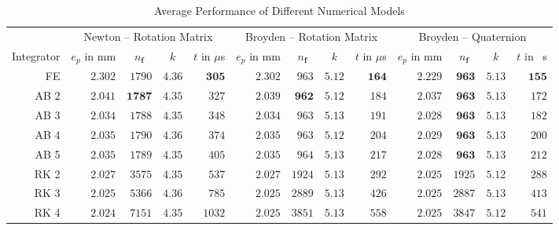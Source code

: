 {\begin{table}
	\centering
	\caption{Average Performance of Different Numerical Models}
	\label{tab:results}
	\begin{tabular}{r rrrr rrrr rrrr}
		\toprule
		& \multicolumn{4}{c}{Newton -- Rotation Matrix}
		& \multicolumn{4}{c}{Broyden -- Rotation Matrix}
        & \multicolumn{4}{c}{Broyden -- Quaternion}\\
		\cmidrule(lr){2-5}
		\cmidrule(lr){6-9}
		\cmidrule(l){10-13}
		\multicolumn{1}{c}{\hfill  Integrator}
		& \multicolumn{1}{c}{$e_p$ in \si{mm}}
		& \multicolumn{1}{c}{$n_{\boldsymbol{f}}$}
		& \multicolumn{1}{c}{$k$}
		& \multicolumn{1}{c}{$t$ in $\mu$\si{s}}
		& \multicolumn{1}{c}{$e_p$ in \si{mm}}
		& \multicolumn{1}{c}{$n_{\boldsymbol{f}}$}
		& \multicolumn{1}{c}{$k$}
		& \multicolumn{1}{c}{$t$ in $\mu$\si{s}}
		& \multicolumn{1}{c}{$e_p$ in \si{mm}}
		& \multicolumn{1}{c}{$n_{\boldsymbol{f}}$}
		& \multicolumn{1}{c}{$k$}
		& \multicolumn{1}{c}{$t$ in \si{\mu s}}\\
		\cmidrule(r){1-1}
		\cmidrule(lr){2-2}
		\cmidrule(lr){3-3}
		\cmidrule(lr){4-4}
		\cmidrule(lr){5-5}
		\cmidrule(lr){6-6}
		\cmidrule(lr){7-7}
		\cmidrule(lr){8-8}
		\cmidrule(lr){9-9}
		\cmidrule(lr){10-10}
		\cmidrule(lr){11-11}
		\cmidrule(lr){12-12}
		\cmidrule(l){13-13}
    FE              & $2.302$ & $1790$ & $4.36$ & $\mathbf{305}$ 
                    & $2.302$ & $963$  & $\mathbf{5.12}$ & $\mathbf{164}$
                    & $2.229$ & $\mathbf{963}$  & $5.13$ & $\mathbf{155}$ \\
    AB 2	        & $2.041$ & $\mathbf{1787}$ & $\mathbf{4.35}$ & $327$  
                    & $2.039$ & $\mathbf{962}$  & $\mathbf{5.12}$ & $184$ 
                    & $2.037$ & $\mathbf{963}$  & $5.13$ & $172$ \\
    AB 3      	    & $2.034$ & $1788$ & $\mathbf{4.35}$ & $348$ 
                    & $2.034$ & $963$  & $5.13$ & $191$ 
                    & $2.028$ & $\mathbf{963}$  & $5.13$ & $182$ \\
    AB 4        	& $2.035$ & $1790$ & $4.36$ & $374$ 
                    & $2.035$ & $963$  & $\mathbf{5.12}$ & $204$ 
                    & $2.029$ & $\mathbf{963}$  & $5.13$ & $200$ \\
    AB 5        	& $2.035$ & $1789$ & $\mathbf{4.35}$ & $405$ 
                    & $2.035$ & $964$  & $5.13$ & $217$ 
                    & $2.028$ & $\mathbf{963}$  & $5.13$ & $212$ \\
    RK 2        	& $2.027$ & $3575$ & $\mathbf{4.35}$ & $537$ 
                    & $2.027$ & $1924$ & $5.13$ & $292$ 
                    & $\mathbf{2.025}$ & $1925$ & $\mathbf{5.12}$ & $288$ \\
    RK 3        	& $2.025$ & $5366$ & $4.36$ & $785$ 
                    & $\mathbf{2.025}$ & $2889$ & $5.13$ & $426$ 
                    & $\mathbf{2.025}$ & $2887$ & $5.13$ & $413$ \\
    RK 4        	& $\mathbf{2.024}$ & $7151$ & $\mathbf{4.35}$ & $1032$ 
                    & $\mathbf{2.025}$ & $3851$ & $5.13$ & $558$ 
                    & $\mathbf{2.025}$ & $3847$ & $\mathbf{5.12}$ & $541$ \\


\end{tabular}
\end{table}}
